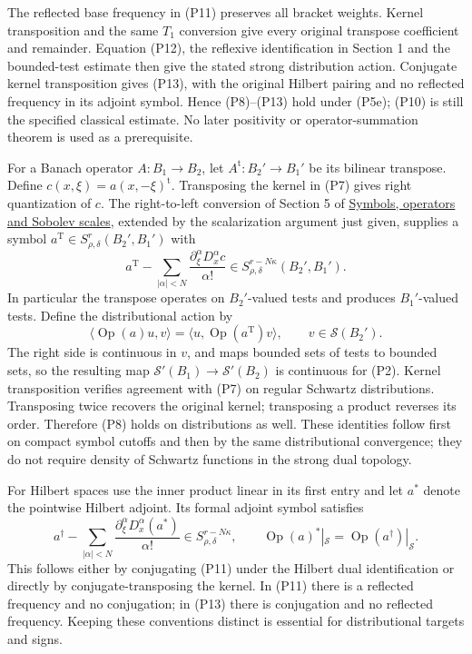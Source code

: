 \documentclass[
  11pt,
]{article}
\begin{document}
The reflected base frequency in (P11) preserves all bracket weights.
Kernel transposition and the same \(T_1\) conversion give every original
transpose coefficient and remainder. Equation (P12), the reflexive
identification in Section 1 and the bounded-test estimate then give the
stated strong distribution action. Conjugate kernel transposition gives
(P13), with the original Hilbert pairing and no reflected frequency in
its adjoint symbol. Hence (P8)--(P13) hold under (P5e); (P10) is still
the specified classical estimate. No later positivity or
operator-summation theorem is used as a prerequisite.

For a Banach operator \(A:B_1\to B_2\), let
\(A^{\mathrm t}:B_2'\to B_1'\) be its bilinear transpose. Define
\(c(x,\xi)=a(x,-\xi)^{\mathrm t}\). Transposing the kernel in (P7) gives
right quantization of \(c\). The right-to-left conversion of Section 5
of \href{euclidean-symbol-calculus.pdf}{Symbols, operators and Sobolev
scales}, extended by the scalarization argument just given, supplies a
symbol \(a^{\mathrm T}\in S^r_{\rho,\delta}(B_2',B_1')\) with \[
 a^{\mathrm T}-\sum_{|\alpha|<N}
 \frac{\partial_\xi^\alpha D_x^\alpha c}{\alpha!}
 \in S^{r-N\kappa}_{\rho,\delta}(B_2',B_1').
\tag{P11}
\] In particular the transpose operates on \(B_2'\)-valued tests and
produces \(B_1'\)-valued tests. Define the distributional action by \[
 \langle\operatorname{Op}(a)u,v\rangle
 =\langle u,\operatorname{Op}(a^{\mathrm T})v\rangle,
 \qquad v\in\mathcal S(B_2').
\tag{P12}
\] The right side is continuous in \(v\), and maps bounded sets of tests
to bounded sets, so the resulting map
\(\mathcal S'(B_1)\to\mathcal S'(B_2)\) is continuous for (P2). Kernel
transposition verifies agreement with (P7) on regular Schwartz
distributions. Transposing twice recovers the original kernel;
transposing a product reverses its order. Therefore (P8) holds on
distributions as well. These identities follow first on compact symbol
cutoffs and then by the same distributional convergence; they do not
require density of Schwartz functions in the strong dual topology.

For Hilbert spaces use the inner product linear in its first entry and
let \(a^*\) denote the pointwise Hilbert adjoint. Its formal adjoint
symbol satisfies \[
 a^\dagger-\sum_{|\alpha|<N}
 \frac{\partial_\xi^\alpha D_x^\alpha(a^*)}{\alpha!}
 \in S^{r-N\kappa}_{\rho,\delta},
 \qquad \operatorname{Op}(a)^*|_{\mathcal S}
 =\operatorname{Op}(a^\dagger)|_{\mathcal S}.
\tag{P13}
\] This follows either by conjugating (P11) under the Hilbert dual
identification or directly by conjugate-transposing the kernel. In (P11)
there is a reflected frequency and no conjugation; in (P13) there is
conjugation and no reflected frequency. Keeping these conventions
distinct is essential for distributional targets and signs.
\end{document}
